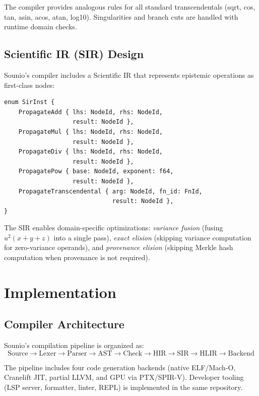 \documentclass[journal]{IEEEtran}
\begin{document}
The compiler provides analogous rules for all standard transcendentals
(sqrt, cos, tan, asin, acos, atan, log10). Singularities and branch cuts
are handled with runtime domain checks.

\subsection{Scientific IR (SIR) Design}

Sounio's compiler includes a Scientific IR that represents epistemic
operations as first-class nodes:

\begin{lstlisting}[caption={SIR epistemic instructions}]
enum SirInst {
    PropagateAdd { lhs: NodeId, rhs: NodeId,
                   result: NodeId },
    PropagateMul { lhs: NodeId, rhs: NodeId,
                   result: NodeId },
    PropagateDiv { lhs: NodeId, rhs: NodeId,
                   result: NodeId },
    PropagatePow { base: NodeId, exponent: f64,
                   result: NodeId },
    PropagateTranscendental { arg: NodeId, fn_id: FnId,
                              result: NodeId },
}
\end{lstlisting}

The SIR enables domain-specific optimizations: \emph{variance fusion}
(fusing $u^2(x + y + z)$ into a single pass), \emph{exact elision}
(skipping variance computation for zero-variance operands), and
\emph{provenance elision} (skipping Merkle hash computation when
provenance is not required).

\section{Implementation}
\label{sec:implementation}

\subsection{Compiler Architecture}

Sounio's compilation pipeline is organized as:
\[
\text{Source} \!\to\! \text{Lexer} \!\to\! \text{Parser} \!\to\! \text{AST} \!\to\!
\text{Check} \!\to\! \text{HIR} \!\to\! \text{SIR} \!\to\! \text{HLIR} \!\to\! \text{Backend}
\]

The pipeline includes four code generation backends (native ELF/Mach-O,
Cranelift JIT, partial LLVM, and GPU via PTX/SPIR-V). Developer tooling
(LSP server, formatter, linter, REPL) is implemented in the same
repository.
\end{document}
